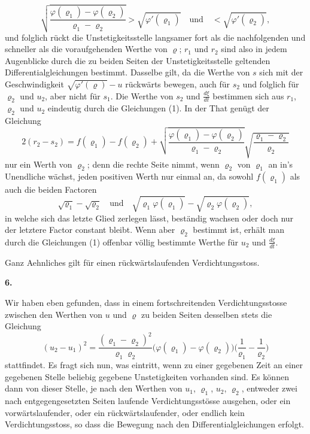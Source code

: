 \documentclass[12pt,a4paper]{book}
\theoremstyle{definition}
\theoremstyle{remark}
\begin{document}
\[
\sqrt{\frac{\varphi(\varrho_{1}) - \varphi(\varrho_{2})}{\varrho_{1} - \varrho_{2}}} > \sqrt{\varphi'(\varrho_{1})}\quad\text{und}\quad < \sqrt{\varphi'(\varrho_{2})},
\]
und folglich r\"uckt die Unstetigkeitsstelle langsamer fort als die nachfolgenden und schneller als die voraufgehenden Werthe von $\varrho$; $r_{1}$ und $r_{2}$ sind also in jedem Augenblicke durch die zu beiden Seiten der Unstetigkeitsstelle geltenden Differentialgleichungen bestimmt. Dasselbe gilt, da die Werthe von $s$ sich mit der Geschwindigkeit $\sqrt{\varphi'(\varrho)} - u$ r\"uckw\"arts bewegen, auch f\"ur $s_{2}$ und folglich f\"ur $\varrho_{2}$ und $u_{2}$, aber nicht f\"ur $s_{1}$. Die Werthe von $s_{2}$ und $\frac{d\xi}{dt}$ bestimmen sich aus $r_{1}$, $\varrho_{2}$ und $u_{2}$ eindeutig durch die Gleichungen (1). In der That gen\"ugt der Gleichung
\begin{equation*}
2(r_{2} - s_{2}) = f(\varrho_{1}) - f(\varrho_{2}) + \sqrt{\frac{\varphi(\varrho_{1}) - \varphi(\varrho_{2})}{\varrho_{1} - \varrho_{2}}}\sqrt{\frac{\varrho_{1} - \varrho_{2}}{\varrho_{2}}}\tag{3}
\end{equation*}
nur ein Werth von $\varrho_{2}$; denn die rechte Seite nimmt, wenn $\varrho_{2}$ von $\varrho_{1}$ an in's Unendliche w\"achst, jeden positiven Werth nur einmal an, da sowohl $f(\varrho_{1})$ als auch die beiden Factoren
\[
\sqrt{\varrho_{1}} - \sqrt{\varrho_{2}}\quad\text{und}\quad\sqrt{\varrho_{1}\varphi(\varrho_{1})} - \sqrt{\varrho_{2}\varphi(\varrho_{2})},
\]
in welche sich das letzte Glied zerlegen l\"asst, best\"andig wachsen oder doch nur der letztere Factor constant bleibt. Wenn aber $\varrho_{2}$ bestimmt ist, erh\"alt man durch die Gleichungen (1) offenbar v\"ollig bestimmte Werthe f\"ur $u_{2}$ und $\frac{d\xi}{dt}$.

Ganz Aehnliches gilt f\"ur einen r\"uckw\"artslaufenden Verdichtungsstoss.

\newpage
\begin{center}
\textbf{6.}
\end{center}

Wir haben eben gefunden, dass in einem fortschreitenden Verdichtungsstosse zwischen den Werthen von $u$ und $\varrho$ zu beiden Seiten desselben stets die Gleichung
\[
(u_{2} - u_{1})^{2} = \frac{(\varrho_{1} - \varrho_{2})^{2}}{\varrho_{1}\varrho_{2}}\bigl(\varphi(\varrho_{1}) - \varphi(\varrho_{2})\bigr)\bigl(\frac{1}{\varrho_{1}} - \frac{1}{\varrho_{2}}\bigr)
\]
stattfindet. Es fragt sich nun, was eintritt, wenn zu einer gegebenen Zeit an einer gegebenen Stelle beliebig gegebene Unstetigkeiten vorhanden sind. Es k\"onnen dann von dieser Stelle, je nach den Werthen von $u_{1}$, $\varrho_{1}$, $u_{2}$, $\varrho_{2}$, entweder zwei nach entgegengesetzten Seiten laufende Verdichtungsst\"osse ausgehen, oder ein vorw\"artslaufender, oder ein r\"uckw\"artslaufender, oder endlich kein Verdichtungsstoss, so dass die Bewegung nach den Differentialgleichungen erfolgt.
\end{document}
